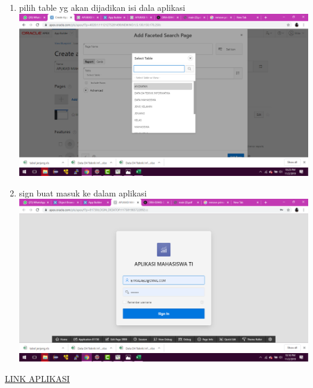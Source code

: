 \begin{enumerate}
\item pilih table yg akan dijadikan isi dala aplikasi\\
\includegraphics[scale= 0.3]{gambar/13.png}\\
\item sign buat masuk ke dalam aplikasi\\
\includegraphics[scale= 0.3]{gambar/14.png}\\

\end{enumerate}

\href{https://apex.oracle.com/pls/apex/f?p=81879:1:19916003679884::NO:::}{LINK APLIKASI}